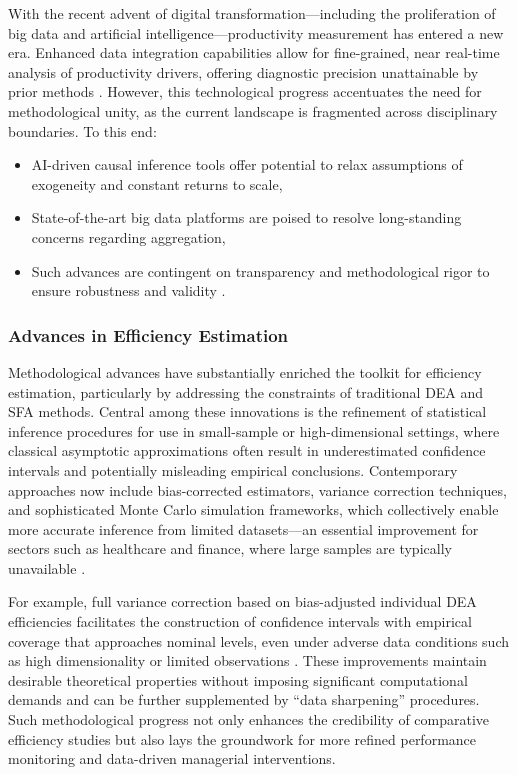 With the recent advent of digital transformation—including the proliferation of big data and artificial intelligence—productivity measurement has entered a new era. Enhanced data integration capabilities allow for fine-grained, near real-time analysis of productivity drivers, offering diagnostic precision unattainable by prior methods \cite{ref86}. However, this technological progress accentuates the need for methodological unity, as the current landscape is fragmented across disciplinary boundaries. To this end:

\begin{itemize}
    \item AI-driven causal inference tools offer potential to relax assumptions of exogeneity and constant returns to scale,
    \item State-of-the-art big data platforms are poised to resolve long-standing concerns regarding aggregation,
    \item Such advances are contingent on transparency and methodological rigor to ensure robustness and validity \cite{ref86}.
\end{itemize}

\subsubsection{Advances in Efficiency Estimation}

Methodological advances have substantially enriched the toolkit for efficiency estimation, particularly by addressing the constraints of traditional DEA and SFA methods. Central among these innovations is the refinement of statistical inference procedures for use in small-sample or high-dimensional settings, where classical asymptotic approximations often result in underestimated confidence intervals and potentially misleading empirical conclusions. Contemporary approaches now include bias-corrected estimators, variance correction techniques, and sophisticated Monte Carlo simulation frameworks, which collectively enable more accurate inference from limited datasets—an essential improvement for sectors such as healthcare and finance, where large samples are typically unavailable \cite{ref87}.

For example, full variance correction based on bias-adjusted individual DEA efficiencies facilitates the construction of confidence intervals with empirical coverage that approaches nominal levels, even under adverse data conditions such as high dimensionality or limited observations \cite{ref87}. These improvements maintain desirable theoretical properties without imposing significant computational demands and can be further supplemented by ``data sharpening'' procedures. Such methodological progress not only enhances the credibility of comparative efficiency studies but also lays the groundwork for more refined performance monitoring and data-driven managerial interventions.

